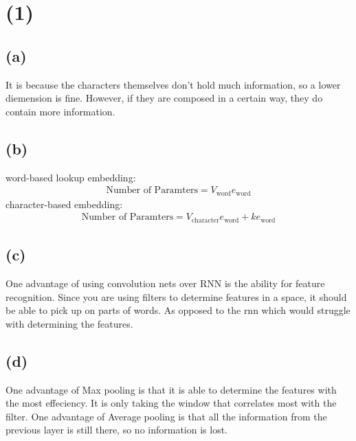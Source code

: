 \documentclass{article}
\begin{document}
\section*{(1)}
\subsection*{(a)}
It is because the characters themselves don't hold much information, so a lower diemension is fine. However, if they are composed in a certain way, they do contain more information.
\subsection*{(b)}
word-based lookup embedding:
\begin{align*}
\text{Number of Paramters} = V_\text{word}e_\text{word}
\end{align*}
character-based embedding:
\begin{align*}
\text{Number of Paramters} = V_\text{character}e_\text{word}+ke_\text{word}
\end{align*}
\subsection*{(c)}
One advantage of using convolution nets over RNN is the ability for feature recognition. Since you are using filters to determine features in a space, it should be able to pick up on parts of words. As opposed to the rnn which would struggle with determining the features.
\subsection*{(d)}
One advantage of Max pooling is that it is able to determine the features with the most effeciency. It is only taking the window that correlates most with the filter. One advantage of Average pooling is that all the information from the previous layer is still there, so no information is lost.
\end{document}
